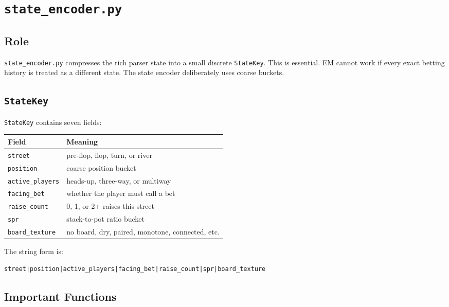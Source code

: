 \documentclass[11pt]{article}
\begin{document}
\section{\texttt{state\_encoder.py}}

\subsection{Role}

\texttt{state\_encoder.py} compresses the rich parser state into a small
discrete \texttt{StateKey}. This is essential. EM cannot work if every exact
betting history is treated as a different state. The state encoder deliberately
uses coarse buckets.

\subsection{\texttt{StateKey}}

\texttt{StateKey} contains seven fields:

\begin{center}
\begin{tabular}{ll}
\toprule
\textbf{Field} & \textbf{Meaning} \\
\midrule
\texttt{street} & pre-flop, flop, turn, or river \\
\texttt{position} & coarse position bucket \\
\texttt{active\_players} & heads-up, three-way, or multiway \\
\texttt{facing\_bet} & whether the player must call a bet \\
\texttt{raise\_count} & 0, 1, or 2+ raises this street \\
\texttt{spr} & stack-to-pot ratio bucket \\
\texttt{board\_texture} & no board, dry, paired, monotone, connected, etc. \\
\bottomrule
\end{tabular}
\end{center}

The string form is:

\begin{lstlisting}
street|position|active_players|facing_bet|raise_count|spr|board_texture
\end{lstlisting}

\subsection{Important Functions}
\end{document}

